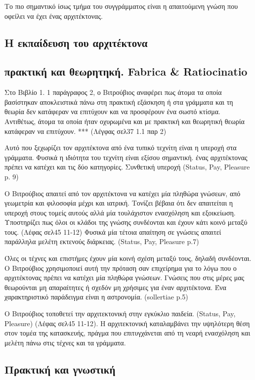 Το πιο σημαντικό ίσως τμήμα του συγγράμματος είναι η απαιτούμενη γνώση που 
οφείλει να έχει ένας αρχιτέκτονας.

\subsection{Η εκπαίδευση του αρχιτέκτονα}

\subsection{πρακτική και θεωρητηκή. Fabrica \& Ratiocinatio}

Στο Βιβλίο 1. 1 παράγραφος 2, ο Βιτρούβιος αναφέρει πως άτομα τα οποία 
βασίστηκαν αποκλειστικά πάνω στη πρακτική εξάσκηση ή  στα γράμματα και τη 
θεωρία δεν κατάφεραν να επιτύχουν και να προσφέρουν ένα σωστό κτίσμα. 
Αντιθέτως, άτομα τα οποία ήταν οχυρωμένα και με πρακτική και θεωρητική θεωρία 
κατάφεραν να επιτύχουν. *** (Λέγφας σελ37 1.1 παρ 2)

Αυτό που ξεχωρίζει τον αρχιτέκτονα από ένα τυπικό τεχνίτη είναι η υπεροχή στα 
γράμματα. Φυσικά η ιδιότητα του τεχνίτη είναι εξίσου σημαντική. ένας 
αρχιτέκτονας πρέπει να κατέχει και τις δύο κατηγορίες. Συνθετική υπεροχή 
(Status, Pay, Pleasure p. 9)

Ο Βιτρούβιος απαιτεί από τον αρχιτέκτονα να κατέχει μία πληθώρα γνώσεων, από 
γεωμετρία και φιλοσοφία μέχρι και ιατρική. Τονίζει βέβαια ότι δεν απαιτείται η 
υπεροχή στους τομείς αυτούς αλλά μία τουλάχιστον ενασχόληση και εξοικείωση. 
Υποστηρίζει πως όλοι οι κλάδοι της γνώσης συνδέονται και έχουν κάτι κοινό 
μεταξύ τους. (Λέφας σελ45 11-12)
Φυσικά μία τέτοια απαίτηση σε γνώσεις απαιτεί παράλληλα μελέτη εκτενούς 
διάρκειας. (Status, Pay, Pleasure p.7)

Όλες οι τέχνες και επιστήμες έχουν μία κοινή σχέση μεταξύ τους, δηλαδή 
συνδέονται. Ο Βιτρούβιος χρησιμοποιεί αυτή την πρόταση σαν επιχείρημα για το 
λόγω που ο αρχιτέκτονας πρέπει να κατέχει μία πληθώρα γνώσεων. Γνώσεις που 
στις μέρες μας θεωρούνται μη απαραίτητες ή σχεδόν μη χρήσιμες για έναν 
αρχιτέκτονα. Ένα χαρακτηριστικό παράδειγμα είναι η αστρονομία. (sollertiae p.5)

Ο Βιτρούβιος τοποθετεί την αρχιτεκτονική στην εγκύκλιο παιδεία. (Status, Pay, 
Pleasure) (Λέφας σελ45 11-12). Η αρχιτεκτονική καταλαμβάνει την υψηλότερη θέση 
στον τομέα της κατασκευής, πράγμα που επιτυγχάνεται από τη νεαρή ενασχόληση και 
μελέτη πάνω στις τέχνες και τα γράμματα.

\subsection{Πρακτική και γνωστική}

